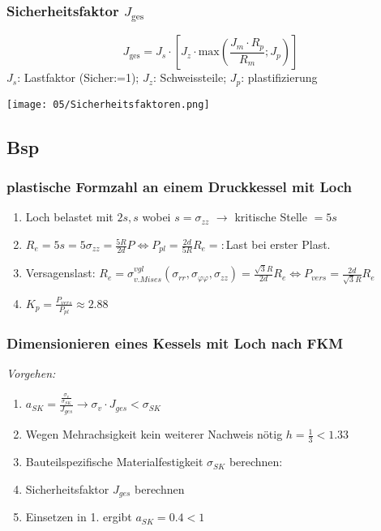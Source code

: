         \subsubsection{Sicherheitsfaktor $J_{\textrm{ges}}$}
        \small\[J_{\textrm{ges}}= J_s \cdot \left[ J_z \cdot \textrm{max}\left(\frac{J_m \cdot R_p}{R_m}; J_p \right) \right] \]\normalsize
        $J_s$: Lastfaktor (Sicher:=1); $J_z$: Schweissteile; $J_p$: plastifizierung
        \begin{center}
            \texttt{[image: 05/Sicherheitsfaktoren.png]}
        \end{center}

    \subsection{Bsp}
        \subsubsection{plastische Formzahl an einem Druckkessel mit Loch}
            \begin{enumerate}
                \item Loch belastet mit $2s,s$ wobei $s=\sigma_{zz}$ $\rightarrow$ kritische Stelle $=5s$
                \item $R_e=5s=5\sigma_{zz}=\frac{5R}{2d}P \Leftrightarrow P_{pl}=\frac{2d}{5R}R_e=:$Last bei erster Plast.
                \item Versagenslast: $R_e=\sigma_{v.Mises}^{vgl}(\sigma_{rr},\sigma_{\varphi\varphi},\sigma_{zz})=\frac{\sqrt{3}R}{2d}R_e \Leftrightarrow P_{vers}=\frac{2d}{\sqrt{3}R}R_e$
                \item $K_p=\frac{P_{vers}}{P_{pl}}\approx 2.88$
            \end{enumerate}

        \subsubsection{Dimensionieren eines Kessels mit Loch nach FKM}
        \textit{Vorgehen:}
        \begin{enumerate}
            \item $ a_{{SK}} = \frac{\frac{\sigma_v}{\sigma_{{SK}}}}{J_{ges}}  \rightarrow  \sigma_v \cdot J_{ges} < \sigma_{{SK}} $
            \item Wegen Mehrachsigkeit kein weiterer Nachweis nötig
            $ h = \frac{1}{3} < 1.33$
            \item Bauteilspezifische Materialfestigkeit $ \sigma_{SK} $ berechnen:
            \item Sicherheitsfaktor $J_{ges}$ berechnen
            \item Einsetzen in 1. ergibt $a_{SK}=0.4<1$
        \end{enumerate}
